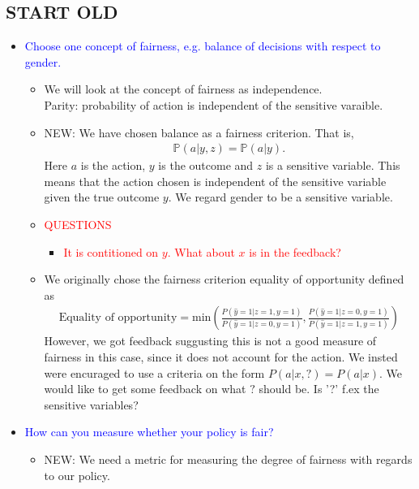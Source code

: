 \subsection*{START OLD}
\begin{itemize}
    \item \textcolor{blue}{Choose one concept of fairness, e.g. balance of decisions with respect to gender.}
    \begin{itemize}
        \item We will look at the concept of fairness as independence. \\
        Parity: probability of action is independent of the sensitive varaible. 
        \item NEW: We have chosen balance as a fairness criterion. That is, 
        \begin{align*}
            \mathbb{P}(a|y,z) = \mathbb{P}(a|y)
        .\end{align*}
        Here $a$ is the action, $y$ is the outcome and $z$ is a sensitive variable. 
        This means that the action chosen is independent of the sensitive variable given the true outcome $y$. 
        We regard gender to be a sensitive variable. 
        \item \textcolor{red}{QUESTIONS}
        \begin{itemize}
            \item \textcolor{red}{It is contitioned on $y$. What about $x$ is in the feedback?}
        \end{itemize}
        \item We originally chose the fairness criterion equality of opportunity defined as 
        \begin{align*}
            \text{Equality of opportunity} = \text{min} \left( \frac{P(\hat{y} = 1 | z = 1, y = 1)}{P(\hat{y} = 1 | z=0, y=1)} , \frac{P(\hat{y} = 1 | z = 0, y = 1)}{P(\hat{y} = 1 | z=1, y=1)}\right)
        \end{align*}
        However, we got feedback suggusting this is not a good measure of fairness in this case, since it does not account for the action. 
        We insted were encuraged to use a criteria on the form $P(a|x,?) = P(a|x)$. 
        We would like to get some feedback on what $?$ should be. Is '?' f.ex the sensitive variables?
    \end{itemize}
    \item \textcolor{blue}{How can you measure whether your policy is fair?}
    \begin{itemize}
        \item NEW: We need a metric for measuring the degree of fairness with regards to our policy. 

\end{itemize}
\end{itemize}
